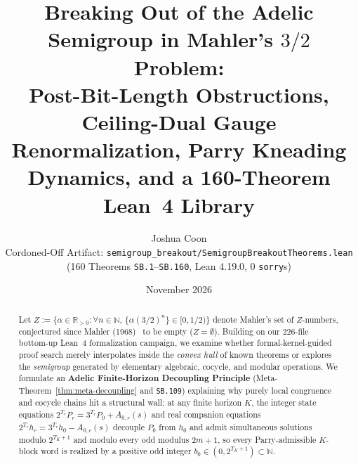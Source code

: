 \documentclass[11pt]{article}
\title{\textbf{Breaking Out of the Adelic Semigroup in Mahler's $3/2$ Problem:\\
Post-Bit-Length Obstructions, Ceiling-Dual Gauge Renormalization, Parry Kneading Dynamics, and a 160-Theorem Lean~4 Library}}
\author{Joshua Coon\\
\small Cordoned-Off Artifact: \nolinkurl{semigroup_breakout/SemigroupBreakoutTheorems.lean} (160 Theorems \texttt{SB.1}--\texttt{SB.160}, Lean 4.19.0, 0 \texttt{sorry}s)}
\date{November 2026}
\begin{document}
\maketitle

\begin{abstract}
Let $Z := \{\alpha \in \mathbb{R}_{>0} : \forall n \in \mathbb{N},\, \{\alpha(3/2)^n\} \in [0, 1/2)\}$ denote Mahler's set of $Z$-numbers, conjectured since Mahler (1968)~\cite{Mahler1968} to be empty ($Z = \emptyset$). Building on our 226-file bottom-up Lean~4 formalization campaign, we examine whether formal-kernel-guided proof search merely interpolates inside the \emph{convex hull} of known theorems or explores the \emph{semigroup} generated by elementary algebraic, cocycle, and modular operations. We formulate an \textbf{Adelic Finite-Horizon Decoupling Principle} (Meta-Theorem~\ref{thm:meta-decoupling} and \texttt{SB.109}) explaining why purely local congruence and cocycle chains hit a structural wall: at any finite horizon $K$, the integer state equations $2^{T_r} P_r = 3^{T_r} P_0 + A_{0,r}(s)$ and real companion equations $2^{T_r} h_r = 3^{T_r} h_0 - A_{0,r}(s)$ decouple $P_0$ from $h_0$ and admit simultaneous solutions modulo $2^{T_K+1}$ and modulo every odd modulus $2m+1$, so every Parry-admissible $K$-block word is realized by a positive odd integer $b_0 \in (0, 2^{T_K+1}) \subset \mathbb{N}$.


\end{abstract}
\end{document}
